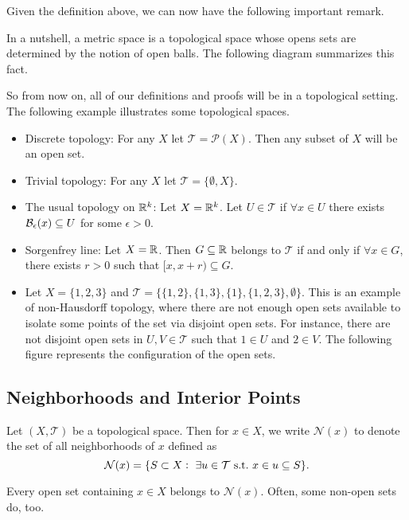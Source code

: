 Given the definition above, we can now have the following important remark. 


\begin{remark}
	In a nutshell, a metric space is a topological space whose opens sets are determined by the notion of open balls. The following diagram summarizes this fact.
	
\end{remark}

So from now on, all of our definitions and proofs will be in a topological setting. The following example illustrates some topological spaces.

\begin{itemize}
	\item Discrete topology: For any $X$ let $\mathcal{T} = \mathcal{P}(X)$. Then any subset of $X$ will be an open set.
	\item Trivial topology: For any $X$ let $\mathcal{T} = \{ \emptyset, X \}$.
	\item The usual topology on $\mathbb{R}^k$: Let $X = \mathbb{R}^k$. Let $U \in \mathcal{T}$ if $\forall x\in U$ there exists $\mathcal{B}_{\epsilon}(x) \subseteq U$ for some $\epsilon>0$.
	\item Sorgenfrey line: Let $X= \mathbb{R}$. Then $G\subseteq \mathbb{R}$ belongs to $\mathcal{T}$ if and only if $\forall x\in G$, there exists $r>0$ such that $[x,x+r) \subseteq G$.
	\item Let $X = \{1,2,3\}$ and $\mathcal{T}=\{ \{1,2\}, \{1,3\}, \{1\}, \{1,2,3\},\emptyset \}$. This is an example of non-Hausdorff topology, where there are not enough open sets available to isolate some points of the set via disjoint open sets. For instance, there are not disjoint open sets in $U,V \in \mathcal{T}$ such that $1\in U$ and $2\in V$. The following figure represents the configuration of the open sets.
	
\end{itemize}
\newpage




\subsection{Neighborhoods and Interior Points}
\begin{defbox}
	Let $(X,\mathcal{T})$ be a topological space. Then for $x\in X$, we write $\mathcal{N}(x)$ to denote the set of all neighborhoods of $x$ defined as 
	\[ \mathcal{N}(x) = \{ S \subset X:\ \exists u\in\mathcal{T} \ \text{s.t.}\  x\in u \subseteq S \}. \]
\end{defbox}
Every open set containing $x\in X$ belongs to $\mathcal{N}(x)$. Often, some non-open sets do, too.

